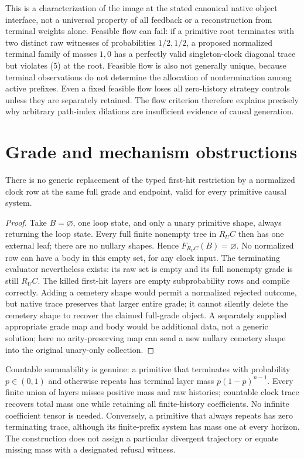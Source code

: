 \documentclass[11pt]{article}
\begin{document}
This is a characterization of the image at the stated canonical native object interface, not a universal property of all feedback or a reconstruction from terminal weights alone. Feasible flow can fail: if a primitive root terminates with two distinct raw witnesses of probabilities $1/2,1/2$, a proposed normalized terminal family of masses $1,0$ has a perfectly valid singleton-clock diagonal trace but violates (5) at the root. Feasible flow is also not generally unique, because terminal observations do not determine the allocation of nontermination among active prefixes. Even a fixed feasible flow loses all zero-history strategy controls unless they are separately retained. The flow criterion therefore explains precisely why arbitrary path-index dilations are insufficient evidence of causal generation.

\section{Grade and mechanism obstructions}
\begin{proposition}
There is no generic replacement of the typed first-hit restriction by a normalized clock row at the same full grade and endpoint, valid for every primitive causal system.
\end{proposition}
\begin{proof}
Take $B=\varnothing$, one loop state, and only a unary primitive shape, always returning the loop state. Every full finite nonempty tree in $R_UC$ then has one external leaf; there are no nullary shapes. Hence $F_{R_UC}(B)=\varnothing$. No normalized row can have a body in this empty set, for any clock input. The terminating evaluator nevertheless exists: its raw set is empty and its full nonempty grade is still $R_UC$. The killed first-hit layers are empty subprobability rows and compile correctly. Adding a cemetery shape would permit a normalized rejected outcome, but native trace preserves that larger entire grade; it cannot silently delete the cemetery shape to recover the claimed full-grade object. A separately supplied appropriate grade map and body would be additional data, not a generic solution; here no arity-preserving map can send a new nullary cemetery shape into the original unary-only collection.
\end{proof}

Countable summability is genuine: a primitive that terminates with probability $p\in(0,1)$ and otherwise repeats has terminal layer mass $p(1-p)^{n-1}$. Every finite union of layers misses positive mass and raw histories; countable clock trace recovers total mass one while retaining all finite-history coefficients. No infinite coefficient tensor is needed. Conversely, a primitive that always repeats has zero terminating trace, although its finite-prefix system has mass one at every horizon. The construction does not assign a particular divergent trajectory or equate missing mass with a designated refusal witness.
\end{document}
